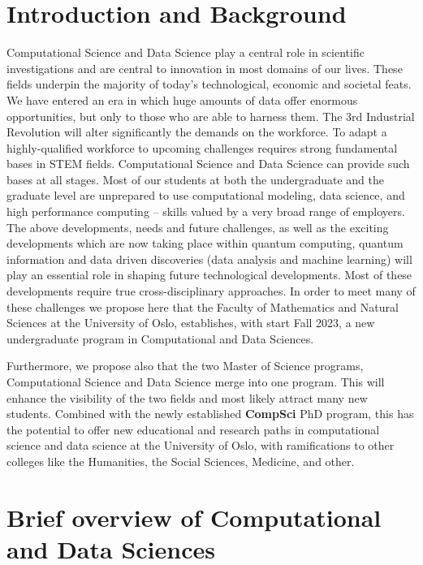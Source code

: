 \documentclass[oneside,final,10pt]{article}
\begin{document}
\section*{Introduction and Background}

Computational Science and Data Science play a central role in scientific investigations and are central to innovation in most domains of our lives. These fields underpin the majority of today's technological, economic and societal feats. We have entered an era in which huge amounts of data offer enormous opportunities, but only to those who are able to harness them. The 3rd Industrial Revolution will alter significantly the demands on the workforce. To adapt a highly-qualified workforce to upcoming challenges requires strong fundamental bases in STEM fields. Computational Science and Data Science can provide such bases at all stages. Most of our students at both the undergraduate and the graduate level are unprepared to use computational modeling, data science, and high performance computing – skills valued by a very broad range of employers. 
The above developments, needs and future challenges, as well as the exciting developments which are now taking place within quantum computing, quantum information and data driven discoveries (data analysis and machine learning) will play an essential role in shaping future technological developments. Most of these developments require true cross-disciplinary approaches.  In order to meet many of these challenges we propose here that the Faculty of Mathematics and Natural Sciences at the University of Oslo, establishes, with start Fall 2023, a new undergraduate program in Computational and Data Sciences.



Furthermore, we propose also that the two Master of Science programs, Computational Science and Data Science merge into one program. This will enhance the visibility of the two fields and most likely attract many new students. Combined with the newly established {\bf CompSci} PhD program, this has the potential to offer new educational and research paths in computational science and data science at the University of Oslo, with ramifications to other colleges like the Humanities, the Social Sciences, Medicine, and other.


\section*{Brief overview of Computational and Data Sciences}
\end{document}
